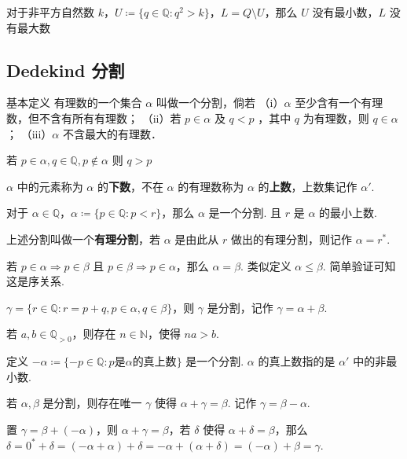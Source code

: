 \begin{proposition}
对于非平方自然数 $k$，$U\coloneqq \{ q\in \mathbb{Q}:q^{2}>k \}$，$L=Q\setminus U$，那么 $U$ 没有最小数，$L$ 没有最大数
\end{proposition}
\subsection{Dedekind 分割}

\begin{definition}[分割]
基本定义 有理数的一个集合 $\alpha$ 叫做一个分割，倘若
（i）$\alpha$ 至少含有一个有理数，但不含有所有有理数；
（ii）若 $p \in \alpha$ 及 $q<p$ ，其中 $q$ 为有理数，则 $q \in \alpha$ ；
（iii）$\alpha$ 不含最大的有理数．
\end{definition}
\begin{proposition}
若 $p\in\alpha, q\in \mathbb{Q},p\not\in\alpha$ 则 $q>p$
\end{proposition}
$\alpha$ 中的元素称为 $\alpha$ 的\textbf{下数}，不在 $\alpha$ 的有理数称为 $\alpha$ 的\textbf{上数}，上数集记作 $\alpha'$.

\begin{proposition}
对于 $\alpha\in \mathbb{Q}$，$\alpha\coloneqq \{ p\in \mathbb{Q} :p<r\}$，那么 $\alpha$ 是一个分割. 且 $r$ 是 $\alpha$ 的最小上数.
\end{proposition}
上述分割叫做一个\textbf{有理分割}，若 $\alpha$ 是由此从 $r$ 做出的有理分割，则记作 $\alpha=r^{*}$.

\begin{definition}[分割之间的序关系]
若 $p\in\alpha\Rightarrow p\in \beta$ 且 $p\in\beta\Rightarrow p\in\alpha$，那么 $\alpha=\beta$. 类似定义 $\alpha\leq\beta$. 简单验证可知这是序关系.
\end{definition}
\begin{proposition}
$\gamma=\{ r\in \mathbb{Q}: r=p+q,p\in\alpha,q\in\beta \}$，则 $\gamma$ 是分割，记作 $\gamma=\alpha+\beta$.
\end{proposition}
\begin{proposition}
若 $a, b\in \mathbb{Q}_{>0}$，则存在 $n\in \mathbb{N}$，使得 $na>b$.
\end{proposition}
定义 $-\alpha\coloneqq\{ -p\in \mathbb{Q}:p\text{是}\alpha\text{的真上数} \}$ 是一个分割. $\alpha$ 的真上数指的是 $\alpha'$ 中的非最小数.

\begin{proposition}
若 $\alpha,\beta$ 是分割，则存在唯一 $\gamma$ 使得 $\alpha+\gamma=\beta$. 记作 $\gamma=\beta-\alpha$.
\end{proposition}
置 $\gamma=\beta+(-\alpha)$，则 $\alpha+\gamma=\beta$，若 $\delta$ 使得 $\alpha+\delta=\beta$，那么 $\delta=0^{*}+\delta=(-\alpha+\alpha)+\delta=-\alpha+(\alpha+\delta)=(-\alpha)+\beta=\gamma$.

